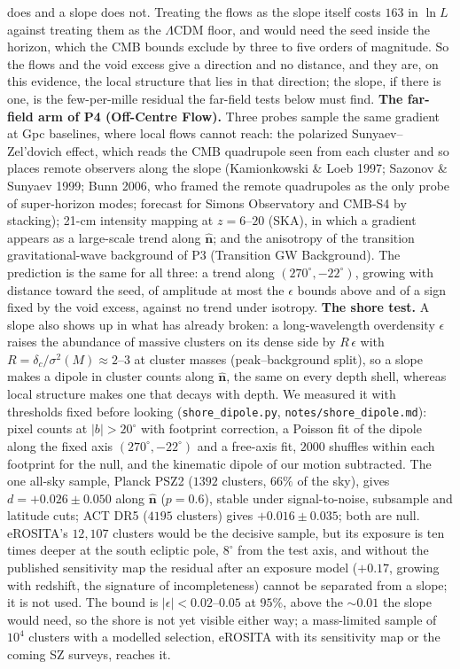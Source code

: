 \documentclass[
  11pt,
]{article}
\begin{document}
does and a slope does not. Treating the flows as the slope itself costs
\(163\) in \(\ln L\) against treating them as the \(\Lambda\)CDM floor,
and would need the seed inside the horizon, which the CMB bounds exclude
by three to five orders of magnitude. So the flows and the void excess
give a direction and no distance, and they are, on this evidence, the
local structure that lies in that direction; the slope, if there is one,
is the few-per-mille residual the far-field tests below must find.
\textbf{The far-field arm of P4 (Off-Centre Flow).} Three probes sample
the same gradient at Gpc baselines, where local flows cannot reach: the
polarized Sunyaev--Zel'dovich effect, which reads the CMB quadrupole
seen from each cluster and so places remote observers along the slope
(Kamionkowski \& Loeb 1997; Sazonov \& Sunyaev 1999; Bunn 2006, who
framed the remote quadrupoles as the only probe of super-horizon modes;
forecast for Simons Observatory and CMB-S4 by stacking); 21-cm intensity
mapping at \(z = 6\)--\(20\) (SKA), in which a gradient appears as a
large-scale trend along \(\hat{\mathbf n}\); and the anisotropy of the
transition gravitational-wave background of P3 (Transition GW
Background). The prediction is the same for all three: a trend along
\((270^\circ, -22^\circ)\), growing with distance toward the seed, of
amplitude at most the \(\epsilon\) bounds above and of a sign fixed by
the void excess, against no trend under isotropy. \textbf{The shore
test.} A slope also shows up in what has already broken: a
long-wavelength overdensity \(\epsilon\) raises the abundance of massive
clusters on its dense side by \(R\,\epsilon\) with
\(R = \delta_c/\sigma^2(M) \approx 2\)--\(3\) at cluster masses
(peak--background split), so a slope makes a dipole in cluster counts
along \(\hat{\mathbf n}\), the same on every depth shell, whereas local
structure makes one that decays with depth. We measured it with
thresholds fixed before looking (\texttt{shore\_dipole.py},
\texttt{notes/shore\_dipole.md}): pixel counts at \(|b| > 20^\circ\)
with footprint correction, a Poisson fit of the dipole along the fixed
axis \((270^\circ, -22^\circ)\) and a free-axis fit, \(2000\) shuffles
within each footprint for the null, and the kinematic dipole of our
motion subtracted. The one all-sky sample, Planck PSZ2 (\(1392\)
clusters, \(66\%\) of the sky), gives \(d = +0.026 \pm 0.050\) along
\(\hat{\mathbf n}\) (\(p = 0.6\)), stable under signal-to-noise,
subsample and latitude cuts; ACT DR5 (\(4195\) clusters) gives
\(+0.016 \pm 0.035\); both are null. eROSITA's \(12{,}107\) clusters
would be the decisive sample, but its exposure is ten times deeper at
the south ecliptic pole, \(8^\circ\) from the test axis, and without the
published sensitivity map the residual after an exposure model
(\(+0.17\), growing with redshift, the signature of incompleteness)
cannot be separated from a slope; it is not used. The bound is
\(|\epsilon| < 0.02\)--\(0.05\) at \(95\%\), above the \(\sim 0.01\) the
slope would need, so the shore is not yet visible either way; a
mass-limited sample of \(10^4\) clusters with a modelled selection,
eROSITA with its sensitivity map or the coming SZ surveys, reaches it.
\end{document}
